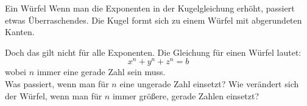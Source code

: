 \begin{surferPage}[Würfel]{Ein Würfel}
Wenn man die Exponenten in der Kugelgleichung erhöht, passiert etwas Überraschendes. Die Kugel formt sich zu einem Würfel mit abgerundeten Kanten.\\
\vspace{0.3cm}

Doch das gilt nicht für alle Exponenten.
Die Gleichung für einen Würfel lautet:
\[x^n+y^n+z^n=b\]
wobei $n$ immer eine gerade Zahl sein muss.\\
\vspace{0.3cm}
Was passiert, wenn man für $n$ eine ungerade Zahl einsetzt?
Wie verändert sich der Würfel, wenn man für $n$ immer größere, gerade Zahlen einsetzt?
\end{surferPage}
